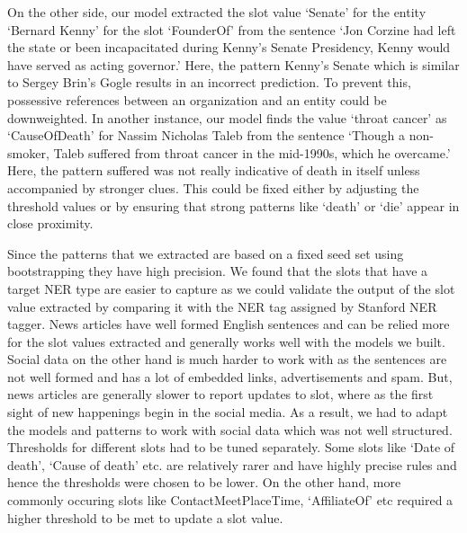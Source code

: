 On the other side, our model extracted the slot value ‘Senate’ for the entity ‘Bernard Kenny’ for the slot ‘FounderOf’ from the sentence ‘Jon Corzine had left the state or been incapacitated during Kenny's Senate Presidency, Kenny would have served as acting governor.’ Here, the pattern Kenny’s Senate which is similar to Sergey Brin’s Gogle results in an incorrect prediction. To prevent this, possessive references between an organization and an entity could be downweighted.  In another instance, our model finds the value ‘throat cancer’ as ‘CauseOfDeath’ for Nassim Nicholas Taleb from the sentence ‘Though a non-smoker, Taleb suffered from throat cancer in the mid-1990s, which he overcame.’ Here, the pattern suffered was not really indicative of death in itself unless accompanied by stronger clues. This could be fixed either by adjusting the threshold values or by ensuring that strong patterns like ‘death’ or ‘die’ appear in close proximity.

	Since the patterns that we extracted are based on a fixed seed set using bootstrapping they have high precision.  We found that the slots that have a target NER type are easier to capture as we could validate the output of the slot value extracted by comparing it with the NER tag assigned by Stanford NER tagger.
	News articles have well formed English sentences and can be relied more for the slot values extracted and generally works well with the models we built. Social data on the other hand is much harder to work with as the sentences are not well formed and has a lot of embedded links, advertisements and spam. But, news articles are generally slower to report updates to slot, where as the first sight of new happenings begin in the social media. As a result, we had to adapt the models and patterns to work with social data which was not well structured. 
Thresholds for different slots had to be tuned separately. Some slots like ‘Date of death’, ‘Cause of death’ etc. are relatively rarer and have highly precise rules and hence the thresholds were chosen to be lower. On the other hand, more commonly occuring slots like ContactMeetPlaceTime, ‘AffiliateOf’ etc required a higher threshold to be met to update a slot value.